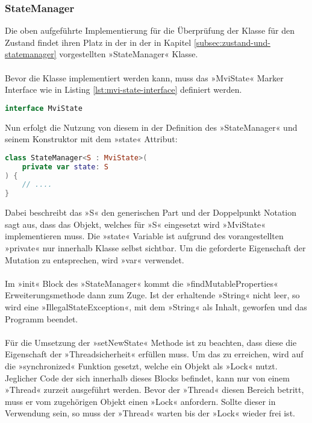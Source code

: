 \subsubsection{StateManager}
\label{subsubsec:state-manager}
Die oben aufgeführte Implementierung für die Überprüfung der Klasse für den Zustand findet ihren Platz in der in der in Kapitel
\ref{subsec:zustand-und-statemanager}
vorgestellten »StateManager« Klasse.
\\\\
Bevor die Klasse implementiert werden kann, muss das »MviState« Marker Interface wie in Listing
\ref{lst:mvi-state-interface}
definiert werden.
\begin{lstlisting}[caption={»MviState« Interface}, label={lst:mvi-state-interface}, language=Kotlin]
interface MviState
\end{lstlisting}
\bigskip
Nun erfolgt die Nutzung von diesem in der Definition des »StateManager« und seinem Konstruktor mit dem »state« Attribut:
\begin{lstlisting}[caption={ »StateManager« mit »MviState«}, label={lst:state-manger-definiton}, language=Kotlin]
class StateManager<S : MviState>(
	private var state: S
) {
	// ....
}
\end{lstlisting}
Dabei beschreibt das »S« den generischen Part und der Doppelpunkt Notation sagt aus, dass das Objekt, welches für »S« eingesetzt wird »MviState« implementieren muss. Die »state« Variable ist aufgrund des vorangestellten »private« nur innerhalb Klasse selbst sichtbar. Um die geforderte Eigenschaft der Mutation zu entsprechen, wird »var« verwendet. 
\\\\
Im »init« Block des »StateManager« kommt die »findMutableProperties« Erweiterungsmethode dann zum Zuge. Ist der erhaltende »String« nicht leer, so wird eine »IllegalStateException«, mit dem »String« als Inhalt, geworfen und das Programm beendet.
\\\\
Für die Umsetzung der »setNewState« Methode ist zu beachten, dass diese die Eigenschaft der »Threadsicherheit« erfüllen muss. Um das zu erreichen, wird auf die »synchronized« Funktion gesetzt, welche ein Objekt als »Lock« nutzt. Jeglicher Code der sich innerhalb dieses Blocks befindet, kann nur von einem »Thread« zurzeit ausgeführt werden. Bevor der »Thread« diesen Bereich betritt, muss er vom zugehörigen Objekt einen »Lock« anfordern. Sollte dieser in Verwendung sein, so muss der »Thread« warten bis der »Lock« wieder frei ist. 
\\\\
